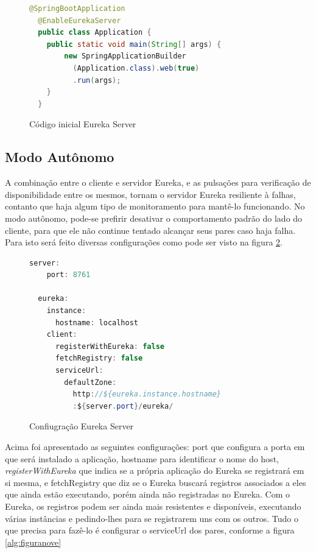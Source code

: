 \documentclass[journal]{IEEEtran}
\begin{document}
\begin{figure}[h]
\centering

\begin{lstlisting}[language=Java]
  @SpringBootApplication
  @EnableEurekaServer
  public class Application {
    public static void main(String[] args) {
        new SpringApplicationBuilder
          (Application.class).web(true)
          .run(args);
    }
  }
\end{lstlisting}

\caption{Código inicial Eureka Server}
\label{alg:figurasete}
\end{figure}

\subsection{Modo Autônomo}

A combinação entre o cliente e servidor Eureka, e as pulsações para verificação de disponibilidade entre os mesmos, tornam o servidor Eureka resiliente à falhas, contanto que haja algum tipo de monitoramento para mantê-lo funcionando. No modo autônomo, pode-se prefirir desativar o comportamento padrão do lado do cliente, para que ele não continue tentado alcançar seus pares caso haja falha. Para isto será feito diversas configurações como pode ser visto na figura \ref{alg:figuraoito}.

\begin{figure}[h]
\centering

\begin{lstlisting}[language=Java]
  server:
    port: 8761

  eureka:
    instance:
      hostname: localhost
    client:
      registerWithEureka: false
      fetchRegistry: false
      serviceUrl:
        defaultZone: 
          http://${eureka.instance.hostname}
          :${server.port}/eureka/
\end{lstlisting}

\caption{Confiugração Eureka Server}
\label{alg:figuraoito}
\end{figure}

Acima foi apresentado as seguintes configurações: port que configura a porta em que será instalado a aplicação, hostname para identificar o nome do host, \emph{registerWithEureka} que indica se a própria aplicação do Eureka se registrará em si mesma, e fetchRegistry que diz se o Eureka buscará registros associados a eles que ainda estão executando, porém ainda não registradas no Eureka.
Com o Eureka, os registros podem ser ainda mais resistentes e disponíveis, executando várias instâncias e pedindo-lhes para se registrarem uns com os outros. Tudo o que precisa para fazê-lo é configurar o serviceUrl dos pares, conforme a figura \ref{alg:figuranove}
\end{document}
